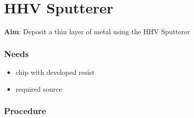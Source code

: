 \section{HHV Sputterer}

\textbf{Aim}:
Deposit a thin layer of metal using the HHV Sputterer

\subsubsection{Needs}
\begin{itemize}[noitemsep]
\item chip with developed resist
\item required source
\end{itemize}

\subsubsection{Procedure}
